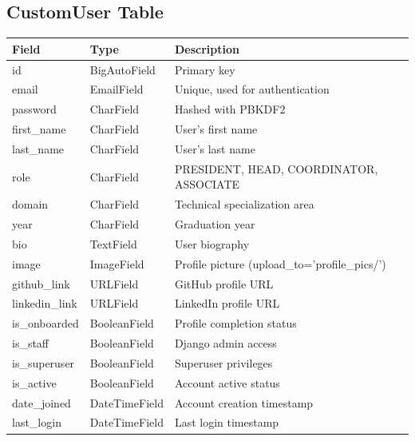 \documentclass[11pt,a4paper]{article}
\begin{document}
\subsection{CustomUser Table}
\begin{tabular}{|p{3cm}|p{3cm}|p{8cm}|}
\hline
\textbf{Field} & \textbf{Type} & \textbf{Description} \\
\hline
id & BigAutoField & Primary key \\
\hline
email & EmailField & Unique, used for authentication \\
\hline
password & CharField & Hashed with PBKDF2 \\
\hline
first\_name & CharField & User's first name \\
\hline
last\_name & CharField & User's last name \\
\hline
role & CharField & PRESIDENT, HEAD, COORDINATOR, ASSOCIATE \\
\hline
domain & CharField & Technical specialization area \\
\hline
year & CharField & Graduation year \\
\hline
bio & TextField & User biography \\
\hline
image & ImageField & Profile picture (upload\_to='profile\_pics/') \\
\hline
github\_link & URLField & GitHub profile URL \\
\hline
linkedin\_link & URLField & LinkedIn profile URL \\
\hline
is\_onboarded & BooleanField & Profile completion status \\
\hline
is\_staff & BooleanField & Django admin access \\
\hline
is\_superuser & BooleanField & Superuser privileges \\
\hline
is\_active & BooleanField & Account active status \\
\hline
date\_joined & DateTimeField & Account creation timestamp \\
\hline
last\_login & DateTimeField & Last login timestamp \\
\hline
\end{tabular}
\end{document}
